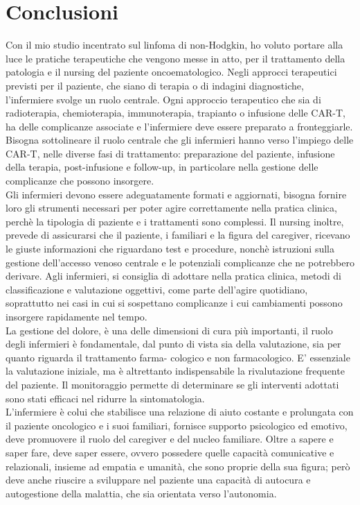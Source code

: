 \section*{Conclusioni}

Con il mio studio incentrato sul linfoma di non-Hodgkin, ho voluto portare alla luce le pratiche terapeutiche 
che vengono messe in atto, per il trattamento della patologia e il nursing del paziente oncoematologico. 
Negli approcci terapeutici previsti per il paziente, che siano di terapia o di indagini diagnostiche, l'infermiere 
svolge un ruolo centrale.
Ogni approccio terapeutico che sia di radioterapia, chemioterapia, immunoterapia, trapianto o infusione delle CAR-T, 
ha delle complicanze associate e l'infermiere deve essere preparato a fronteggiarle. 
Bisogna sottolineare il ruolo centrale che gli infermieri hanno verso l’impiego delle CAR-T, nelle diverse fasi 
di trattamento: preparazione del paziente, infusione della terapia, post-infusione e follow-up, in particolare nella 
gestione delle complicanze che possono insorgere.\\
Gli infermieri devono essere adeguatamente formati e aggiornati, bisogna fornire loro gli strumenti necessari per poter 
agire correttamente nella pratica clinica, perchè la tipologia di paziente e i trattamenti sono complessi. 
Il nursing inoltre, prevede di assicurarsi che il paziente, i familiari e la figura del caregiver, ricevano le 
giuste informazioni che riguardano test e procedure, nonchè istruzioni sulla gestione dell’accesso venoso centrale e le
potenziali complicanze che ne potrebbero derivare.
Agli infermieri, si consiglia di adottare nella pratica clinica, metodi di classificazione e valutazione oggettivi, 
come parte dell’agire quotidiano, soprattutto nei casi in cui si sospettano complicanze i
cui cambiamenti possono insorgere rapidamente nel tempo.\\
La gestione del dolore, è una delle dimensioni di cura più importanti, il ruolo degli infermieri è
fondamentale, dal punto di vista sia della valutazione, sia per quanto riguarda il trattamento farma-
cologico e non farmacologico. 
E' essenziale la valutazione iniziale, ma è altrettanto indispensabile la rivalutazione
frequente del paziente. Il monitoraggio permette di determinare se gli interventi adottati sono stati
efficaci nel ridurre la sintomatologia.\\
L’infermiere è colui che stabilisce una relazione di aiuto costante e prolungata con il paziente 
oncologico e i suoi familiari, fornisce supporto psicologico ed emotivo, deve promuovere il ruolo del
caregiver e del nucleo familiare. Oltre a sapere e saper fare, deve saper essere, ovvero possedere quelle 
capacità comunicative e relazionali, insieme ad empatia e umanità, che sono proprie della sua figura;
però deve anche riuscire a sviluppare nel paziente una capacità di autocura e autogestione della malattia, 
che sia orientata verso l’autonomia.
